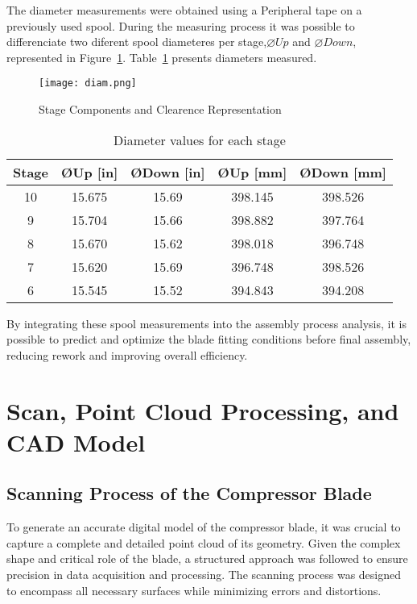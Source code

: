The diameter measurements were obtained using a Peripheral tape on a previously used spool. 
During the measuring process it was possible to differenciate two diferent spool diameteres per stage,$\varnothing Up$ and $\varnothing Down$, represented in Figure~\ref{fig:diam.png}.
Table~\ref{tab:diameters} presents diameters measured.

\begin{figure}[H]
    \centering
    \texttt{[image: diam.png]}
    \caption{Stage Components and Clearence Representation}
    \label{fig:diam.png}
\end{figure}


\begin{table}[h]
    \centering
    \begin{tabular}{|c|c|c|c|c|}
        \hline
        Stage & ØUp [in] & ØDown [in] & ØUp [mm] & ØDown [mm]\\
        \hline
        10 & 15.675 & 15.69 & 398.145 & 398.526 \\
        9  & 15.704 & 15.66 & 398.882 & 397.764 \\
        8  & 15.670 & 15.62 & 398.018 & 396.748 \\
        7  & 15.620 & 15.69 & 396.748 & 398.526 \\
        6  & 15.545 & 15.52 & 394.843 & 394.208 \\
        \hline
    \end{tabular}
    \caption{Diameter values for each stage}
    \label{tab:diameters}
\end{table}

By integrating these spool measurements into the assembly process analysis, it is possible to predict and optimize the blade fitting conditions before final assembly, reducing rework and improving overall efficiency.

\chapter{Scan, Point Cloud Processing, and CAD Model}
\label{cha:digi}


\section{Scanning Process of the Compressor Blade}
\label{sec:scan}

To generate an accurate digital model of the compressor blade, it was crucial to capture a complete and detailed point cloud of its geometry. Given the complex shape and critical role of the blade, a structured approach was followed to ensure precision in data acquisition and processing. The scanning process was designed to encompass all necessary surfaces while minimizing errors and distortions.

